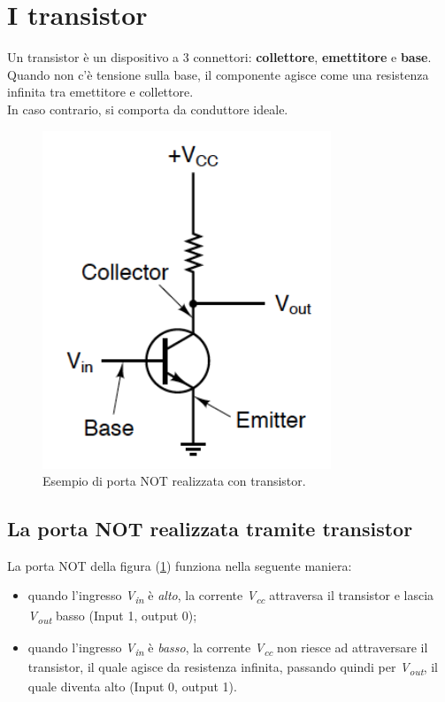 \documentclass[12pt]{article}
\begin{document}
\section{I transistor}
Un transistor è un dispositivo a 3 connettori: \textbf{collettore}, \textbf{emettitore} e \textbf{base}.\\
Quando non c'è tensione sulla base, il componente agisce come una resistenza infinita tra emettitore e collettore.\\
In caso contrario, si comporta da conduttore ideale.
\begin{figure}[!htb]
    \centering
    \includegraphics[width=.7\textwidth, height=.7\textheight,keepaspectratio]{porte_logiche/transistor_not_ex.png} %
    \begin{center}
        \caption{\label{fig:transistor_not_esempio}Esempio di porta NOT realizzata con transistor.} %
    \end{center}
\end{figure}
\subsection{La porta NOT realizzata tramite transistor}
La porta NOT della figura (\ref{fig:transistor_not_esempio}) funziona nella seguente maniera:
\begin{itemize}
    \item quando l'ingresso \textit{V\textsubscript{in}} è \textit{alto}, la corrente \textit{V\textsubscript{cc}} attraversa il transistor e lascia \textit{V\textsubscript{out}} basso (Input 1, output 0);
    \item quando l'ingresso \textit{V\textsubscript{in}} è \textit{basso}, la corrente \textit{V\textsubscript{cc}} non riesce ad attraversare il transistor, il quale agisce da resistenza infinita, passando quindi per \textit{V\textsubscript{out}}, il quale diventa alto (Input 0, output 1).
\end{itemize}
\end{document}
